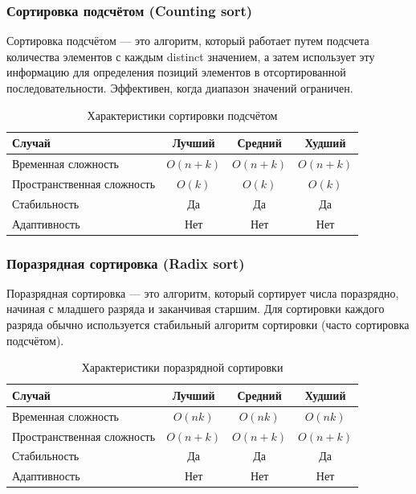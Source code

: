 \documentclass[a4paper,12pt]{article}
\begin{document}
\subsubsection{Сортировка подсчётом (Counting sort)}
\label{subsubsec:сортировка-подсчётом-counting-sort}

Сортировка подсчётом --- это алгоритм, который работает путем подсчета количества элементов с каждым distinct значением, а затем использует эту информацию для определения позиций элементов в отсортированной последовательности. Эффективен, когда диапазон значений ограничен.

\begin{table}[H]
    \centering
    \begin{tabular}{|l|c|c|c|}
        \hline
        Случай & Лучший & Средний & Худший \\
        \hline
        Временная сложность & $O(n + k)$ & $O(n + k)$ & $O(n + k)$ \\
        \hline
        Пространственная сложность & $O(k)$ & $O(k)$ & $O(k)$ \\
        \hline
        Стабильность & Да & Да & Да \\
        \hline
        Адаптивность & Нет & Нет & Нет \\
        \hline
    \end{tabular}
    \caption{Характеристики сортировки подсчётом}
\end{table}

\subsubsection{Поразрядная сортировка (Radix sort)}
\label{subsubsec:поразрядная-сортировка-radix-sort}

Поразрядная сортировка --- это алгоритм, который сортирует числа поразрядно, начиная с младшего разряда и заканчивая старшим. Для сортировки каждого разряда обычно используется стабильный алгоритм сортировки (часто сортировка подсчётом).

\begin{table}[H]
    \centering
    \begin{tabular}{|l|c|c|c|}
        \hline
        Случай & Лучший & Средний & Худший \\
        \hline
        Временная сложность & $O(nk)$ & $O(nk)$ & $O(nk)$ \\
        \hline
        Пространственная сложность & $O(n + k)$ & $O(n + k)$ & $O(n + k)$ \\
        \hline
        Стабильность & Да & Да & Да \\
        \hline
        Адаптивность & Нет & Нет & Нет \\
        \hline
    \end{tabular}
    \caption{Характеристики поразрядной сортировки}
\end{table}
\end{document}
